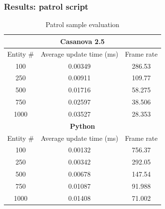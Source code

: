 \documentclass[mathserif,serif]{beamer}
\begin{document}
\begin{frame}
	\frametitle{Results: patrol script}
	\begin{table}
		\centering
		\tiny	
		\begin{tabular}{|c|c|c|}
			\hline
			\multicolumn{3}{|c|}{\textbf{Casanova 2.5}} \\
			\hline
			Entity \# & Average update time (ms) & Frame rate \\
			\hline
			100 & 0.00349 & 286.53 \\
			\hline
			250 & 0.00911 & 109.77 \\
			\hline
			500 & 0.01716 & 58.275 \\
			\hline
			750 & 0.02597 & 38.506 \\
			\hline
			1000 & 0.03527 & 28.353 \\
			\hline
			\multicolumn{3}{|c|}{\textbf{Python}} \\
			\hline
			Entity \# & Average update time (ms) & Frame rate \\
			\hline
			100 & 0.00132 & 756.37 \\
			\hline
			250 & 0.00342 & 292.05 \\
			\hline
			500 & 0.00678 & 147.54 \\
			\hline
			750 & 0.01087 & 91.988 \\
			\hline
			1000 & 0.01408 & 71.002 \\
			\hline
		\end{tabular}
		\caption{Patrol sample evaluation}
		\label{tab:evaluation}
	\end{table}	
\end{frame}
\end{document}
